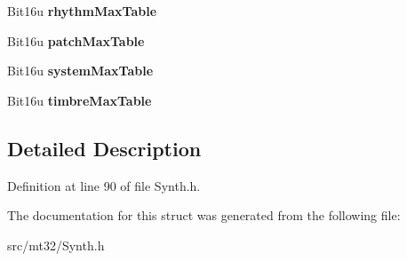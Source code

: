 \begin{DoxyCompactItemize}
\item 
\hypertarget{structMT32Emu_1_1ControlROMMap_afce44d07872e23dba9c9b9b8b6ffb81e}{Bit16u {\bfseries rhythm\-Max\-Table}}\label{structMT32Emu_1_1ControlROMMap_afce44d07872e23dba9c9b9b8b6ffb81e}

\item 
\hypertarget{structMT32Emu_1_1ControlROMMap_ad606ad99f5e7c4bfeccc25756e52a0cf}{Bit16u {\bfseries patch\-Max\-Table}}\label{structMT32Emu_1_1ControlROMMap_ad606ad99f5e7c4bfeccc25756e52a0cf}

\item 
\hypertarget{structMT32Emu_1_1ControlROMMap_afe5175efc836472a4f67cd4ace535801}{Bit16u {\bfseries system\-Max\-Table}}\label{structMT32Emu_1_1ControlROMMap_afe5175efc836472a4f67cd4ace535801}

\item 
\hypertarget{structMT32Emu_1_1ControlROMMap_a7268b10f6d33f608b5a3b3db6a96daa9}{Bit16u {\bfseries timbre\-Max\-Table}}\label{structMT32Emu_1_1ControlROMMap_a7268b10f6d33f608b5a3b3db6a96daa9}

\end{DoxyCompactItemize}


\subsection{Detailed Description}


Definition at line 90 of file Synth.\-h.



The documentation for this struct was generated from the following file\-:\begin{DoxyCompactItemize}
\item 
src/mt32/Synth.\-h\end{DoxyCompactItemize}
